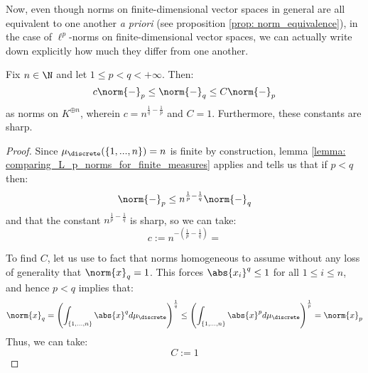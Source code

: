         Now, even though norms on finite-dimensional vector spaces in general are all equivalent to one another \textit{a priori} (see proposition \ref{prop: norm_equivalence}), in the case of $\ell^p$-norms on finite-dimensional vector spaces, we can actually write down explicitly how much they differ from one another.
        \begin{lemma} \label{lemma: sharp_comparison_of_ell_p_norms_in_finite_dimensions}
            Fix $n \in \N$ and let $1 \leq p < q < +\infty$. Then:
                $$c \norm{-}_p \leq \norm{-}_q \leq C \norm{-}_p$$
            as norms on $K^{\oplus n}$, wherein $c = n^{\frac1q - \frac1p}$ and $C = 1$. Furthermore, these constants are sharp.
        \end{lemma}
            \begin{proof}
                Since $\mu_{\discrete}(\{1, ..., n\}) = n$ is finite by construction, lemma \ref{lemma: comparing_L_p_norms_for_finite_measures} applies and tells us that if $p < q$ then:
                    $$\norm{-}_p \leq n^{\frac1p - \frac1q} \norm{-}_q$$
                and that the constant $n^{\frac1p - \frac1q}$ is sharp, so we can take:
                    $$c := n^{-(\frac1p - \frac1q)} = $$

                To find $C$, let us use to fact that norms homogeneous to assume without any loss of generality that $\norm{x}_q = 1$. This forces $\abs{x_i}^q \leq 1$ for all $1 \leq i \leq n$, and hence $p < q$ implies that:
                    $$\norm{x}_q = \left( \int_{\{1, ..., n\}} \abs{x}^q d\mu_{\discrete} \right)^{\frac1q} \leq \left( \int_{\{1, ..., n\}} \abs{x}^p d\mu_{\discrete} \right)^{\frac1p} = \norm{x}_p$$
                Thus, we can take:
                    $$C := 1$$
            \end{proof}

